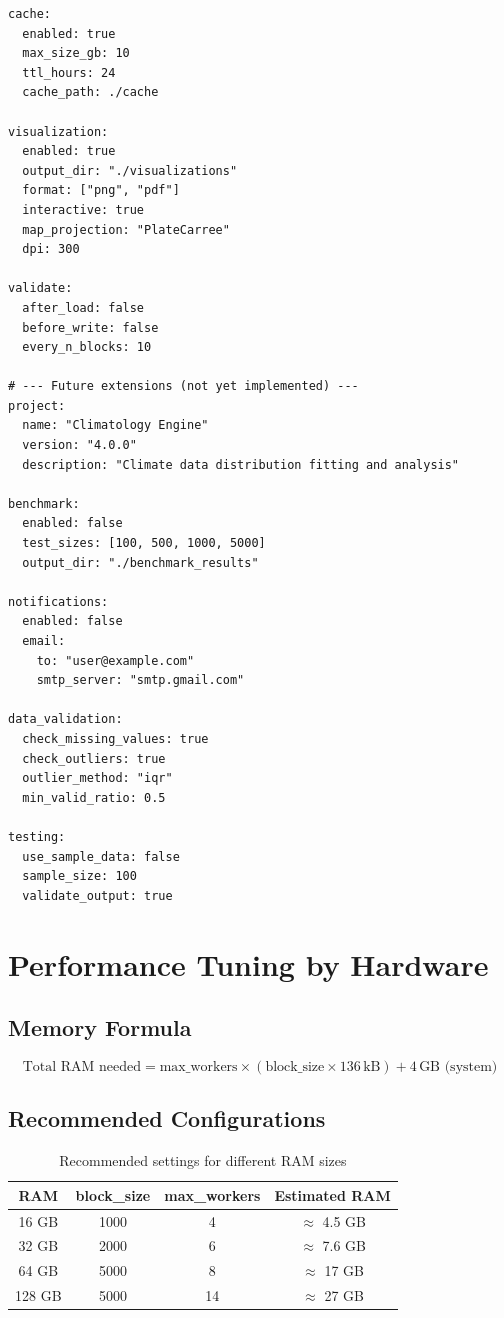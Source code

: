 \documentclass[12pt,a4paper]{article}
\begin{document}
\begin{lstlisting}[style=yamlstyle]
cache:
  enabled: true
  max_size_gb: 10
  ttl_hours: 24
  cache_path: ./cache

visualization:
  enabled: true
  output_dir: "./visualizations"
  format: ["png", "pdf"]
  interactive: true
  map_projection: "PlateCarree"
  dpi: 300

validate:
  after_load: false
  before_write: false
  every_n_blocks: 10

# --- Future extensions (not yet implemented) ---
project:
  name: "Climatology Engine"
  version: "4.0.0"
  description: "Climate data distribution fitting and analysis"

benchmark:
  enabled: false
  test_sizes: [100, 500, 1000, 5000]
  output_dir: "./benchmark_results"

notifications:
  enabled: false
  email:
    to: "user@example.com"
    smtp_server: "smtp.gmail.com"

data_validation:
  check_missing_values: true
  check_outliers: true
  outlier_method: "iqr"
  min_valid_ratio: 0.5

testing:
  use_sample_data: false
  sample_size: 100
  validate_output: true
\end{lstlisting}

\section{Performance Tuning by Hardware}

\subsection{Memory Formula}
\[
\text{Total RAM needed} = \text{max\_workers} \times \left( \text{block\_size} \times 136 \, \text{kB} \right) + 4\,\text{GB (system)}
\]

\subsection{Recommended Configurations}
\begin{table}[h!]
\centering
\begin{tabular}{|c|c|c|c|}
\hline
\textbf{RAM} & \textbf{block\_size} & \textbf{max\_workers} & \textbf{Estimated RAM} \\
\hline
16 GB & 1000 & 4 & $\approx$ 4.5 GB \\
32 GB & 2000 & 6 & $\approx$ 7.6 GB \\
64 GB & 5000 & 8 & $\approx$ 17 GB \\
128 GB & 5000 & 14 & $\approx$ 27 GB \\
\hline
\end{tabular}
\caption{Recommended settings for different RAM sizes}
\end{table}
\end{document}
